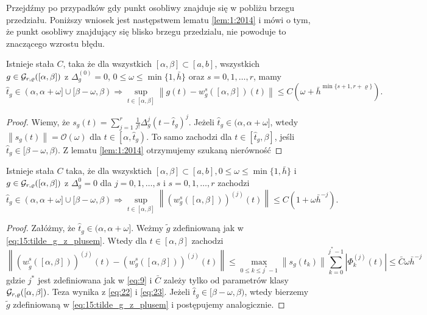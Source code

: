 \documentclass[oik, pdftex, robocza, man]{mgrwms}
\begin{document}
    Przejdźmy po przypadków gdy punkt osobliwy znajduje się w pobliżu brzegu przedziału. Poniższy wniosek jest następstwem lematu \ref{lem:1:2014} i mówi o tym, że punkt osobliwy znajdujący się blisko brzegu przedzialu, nie powoduje to znaczącego wzrostu błędu.

    \begin{cor} \label{cor:1}
        Istnieje stała $C$, taka że dla wszystkich $[\alpha, \beta] \subset [a, b]$, wszystkich $g \in \mathcal{G}_{r,\varrho}([\alpha,\beta])$ z $\Delta_{g}^{(0)} = 0$, $0 \leq \omega \leq \min \{1, \bar{h}\}$ oraz $s=0,1,\dots,r$, mamy
        \begin{equation*}
            \hat{t}_{g} \in(\alpha, \alpha+\omega] \cup[\beta-\omega, \beta) \Longrightarrow  \sup_{t \in[\alpha, \beta]}\left\|g(t)-w_{g}^{s}([\alpha, \beta])(t)\right\| \leq C\left(\omega+\bar{h}^{\min \{s+1, r+\varrho\}}\right).
        \end{equation*}
    \end{cor}
    \begin{proof}
        Wiemy, że $s_{g}(t)=\sum_{j=1}^{r} \frac{1}{j !} \Delta_{g}^{j}\left(t-\hat{t}_{g}\right)^{j}$. Jeżeli $\hat{t}_{g} \in(\alpha, \alpha+\omega]$, wtedy $\left\|s_{g}(t)\right\|=\mathcal{O}(\omega)$ dla $t \in\left[\alpha, \hat{t}_{g}\right) .$ To samo zachodzi dla $t \in\left[\hat{t}_{g}, \beta\right]$, jeśli $\hat{t}_{g} \in[\beta-\omega, \beta)$. Z lematu \ref{lem:1:2014} otrzymujemy szukaną nierówność
    \end{proof}

    \begin{lemma} \label{lem:3}
        Istnieje stała $C$ taka, że dla wszysktich $[\alpha, \beta] \subset [a, b], 0 \leq \omega \leq \min \{1, \bar{h}\}$ i $g \in \mathcal{G}_{r,\varrho}([\alpha,\beta])$ z $\Delta_{g}^{0}=0$ dla $j=0,1, \ldots, s$ i $s=0,1, \ldots, r$ zachodzi
        \begin{equation*}
            \hat{t}_{g} \in(\alpha, \alpha+\omega] \cup[\beta-\omega, \beta) \Rightarrow \sup _{t \in[\alpha, \beta]}\left\|\left(w_{g}^{s}([\alpha, \beta])\right)^{(j)}(t)\right\| \leq C\left(1+\omega \bar{h}^{-j}\right).
        \end{equation*}
    \end{lemma}
    \begin{proof}
        Załóżmy, że $\hat{t}_{g} \in (\alpha, \alpha+\omega]$. Weżmy $\tilde{g}$ zdefiniowaną jak w \eqref{eq:15:tilde_g_z_plusem}. Wtedy dla $t \in[\alpha, \beta]$ zachodzi
        \begin{equation} \label{eq:24}
            \left\|\left(w_{\tilde{g}}^{s}([\alpha, \beta])\right)^{(j)}(t)-\left(w_{g}^{s}([\alpha, \beta])\right)^{(j)}(t)\right\| \leq \max _{0 \leq k \leq j^{*}-1}\left\|s_{g}\left(t_{k}\right)\right\| \sum_{k=0}^{j^{*}-1}\left|\Phi_{k}^{(j)}(t)\right| \leq \bar{C} \omega \bar{h}^{-j}
        \end{equation}
        gdzie $j^{*}$ jest zdefiniowana jak w \eqref{eq:9} i $\bar{C}$  zależy tylko od parametrów klasy $\mathcal{G}_{r,\varrho}([\alpha,\beta])$. Teza wynika z \eqref{eq:22} i \eqref{eq:23}. Jeżeli $\hat{t}_{g} \in[\beta-\omega, \beta)$, wtedy bierzemy $\tilde{g}$ zdefiniowaną w \eqref{eq:15:tilde_g_z_plusem} i postępujemy analogicznie.
    \end{proof}
\end{document}
